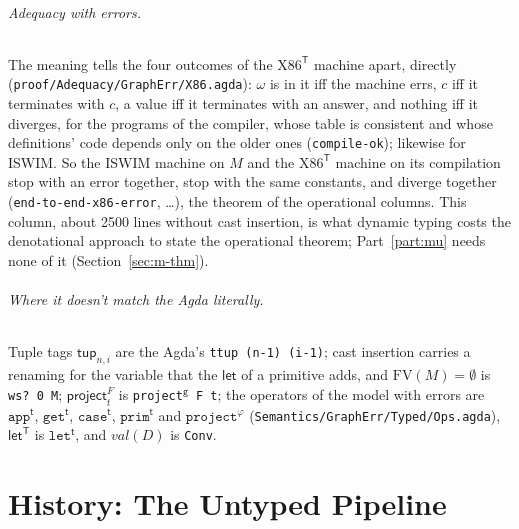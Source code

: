 \documentclass[10pt]{article}
\theoremstyle{acmplain}
\newcommand{\key}[1]{\mathsf{#1}}
\newcommand{\FV}{\mathrm{FV}}
\newcommand{\Tl}[1]{\textrm{#1}^{\mathsf{T}}}  %
\newcommand{\Tttup}[2]{\key{tup}_{#1,#2}}      %
\newcommand{\Tletv}{\key{let}^{\mathsf{T}}}               %
\begin{document}
\paragraph{Adequacy with errors.} The meaning tells the four outcomes of
the $\Tl{X86}$ machine apart, directly
(\texttt{proof/Adequacy/GraphErr/X86.agda}): $\omega$ is in it iff the
machine errs, $c$ iff it terminates with $c$, a value iff it terminates
with an answer, and nothing iff it diverges, for the programs of the
compiler, whose table is consistent and whose definitions' code depends
only on the older ones (\texttt{compile-ok}); likewise for ISWIM. So the
ISWIM machine on $M$ and the $\Tl{X86}$ machine on its compilation stop with
an error together, stop with the same constants, and diverge together
(\texttt{end-to-end-x86-error}, \ldots), the theorem of the operational
columns. This column, about 2500 lines without cast insertion, is what
dynamic typing costs the denotational approach to state the operational
theorem; Part~\ref{part:mu} needs none of it (Section~\ref{sec:m-thm}).

\paragraph{Where it doesn't match the Agda literally.} Tuple tags
$\Tttup{n}{i}$ are the Agda's \texttt{ttup (n-1) (i-1)}; cast insertion
carries a renaming for the variable that the $\key{let}$ of a primitive adds,
and $\FV(M) = \emptyset$ is \texttt{ws? 0 M}; $\key{project}^F_t$ is
\texttt{project$^{\mathtt{g}}$ F t}; the operators of the model with errors
are $\texttt{app}^{\mathsf{t}}$, $\texttt{get}^{\mathsf{t}}$,
$\texttt{case}^{\mathsf{t}}$, $\texttt{prim}^{\mathsf{t}}$ and
$\texttt{project}^{\varphi}$ (\texttt{Semantics/GraphErr/Typed/Ops.agda}),
$\Tletv$ is $\texttt{let}^{\mathsf{t}}$, and $\mathit{val}(D)$ is
\texttt{Conv}.

\part{History: The Untyped Pipeline}\label{part:untyped}
\end{document}
